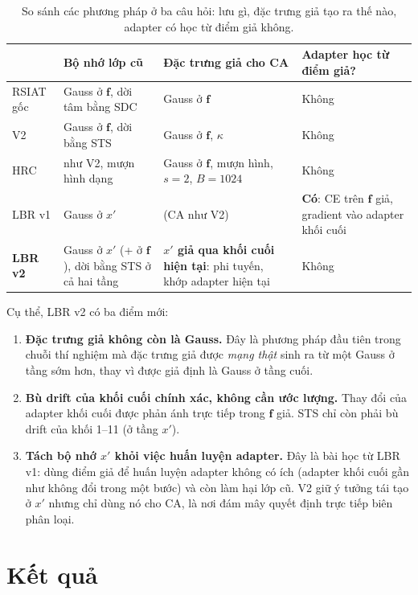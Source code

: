 \documentclass[11pt]{article}
\newcommand{\vf}{\mathbf{f}}
\begin{document}
\begin{table}[H]
\centering\small
\caption{So sánh các phương pháp ở ba câu hỏi: lưu gì, đặc trưng giả tạo ra thế nào, adapter có học từ điểm giả không.}
\begin{tabular}{p{2.3cm}p{3.6cm}p{4.6cm}p{3.6cm}}
\toprule
& Bộ nhớ lớp cũ & Đặc trưng giả cho CA & Adapter học từ điểm giả?\\
\midrule
RSIAT gốc & Gauss ở $\vf$, dời tâm bằng SDC & Gauss ở $\vf$ & Không\\
V2 & Gauss ở $\vf$, dời bằng STS & Gauss ở $\vf$, $\kappa$ & Không\\
HRC & như V2, mượn hình dạng & Gauss ở $\vf$, mượn hình, $s=2$, $B=1024$ & Không\\
LBR v1 & Gauss ở $x'$ & (CA như V2) & \textbf{Có}: CE trên $\vf$ giả, gradient vào adapter khối cuối\\
\textbf{LBR v2} & Gauss ở $x'$ (+ ở $\vf$), dời bằng STS ở cả hai tầng & \textbf{$x'$ giả qua khối cuối hiện tại}: phi tuyến, khớp adapter hiện tại & Không\\
\bottomrule
\end{tabular}
\end{table}

\noindent Cụ thể, LBR v2 có ba điểm mới:
\begin{enumerate}
\item \textbf{Đặc trưng giả không còn là Gauss.} Đây là phương pháp đầu tiên trong chuỗi thí nghiệm mà đặc trưng giả
      được \emph{mạng thật} sinh ra từ một Gauss ở tầng sớm hơn, thay vì được giả định là Gauss ở tầng cuối.
\item \textbf{Bù drift của khối cuối chính xác, không cần ước lượng.} Thay đổi của adapter khối cuối được phản ánh
      trực tiếp trong $\vf$ giả. STS chỉ còn phải bù drift của khối 1--11 (ở tầng $x'$).
\item \textbf{Tách bộ nhớ $x'$ khỏi việc huấn luyện adapter.} Đây là bài học từ LBR v1: dùng điểm giả để huấn luyện
      adapter không có ích (adapter khối cuối gần như không đổi trong một bước) và còn làm hại lớp cũ. V2 giữ ý tưởng
      tái tạo ở $x'$ nhưng chỉ dùng nó cho CA, là nơi đám mây quyết định trực tiếp biên phân loại.
\end{enumerate}

\section{Kết quả}
\end{document}
